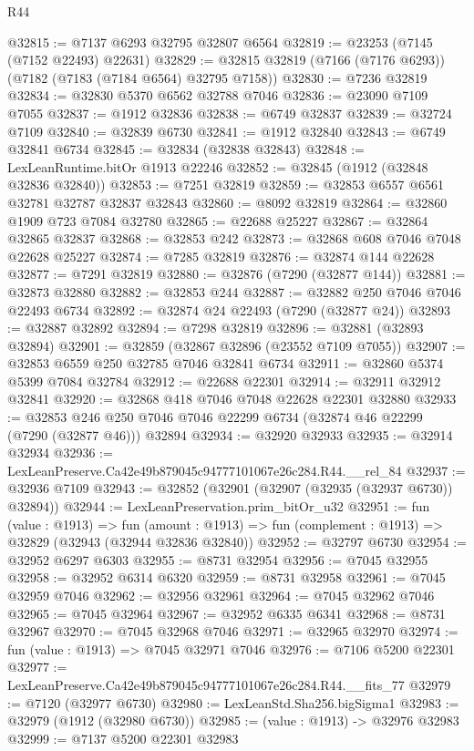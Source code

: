 \begin{lexlean}{R44}
\begin{coremodule}
{@32815 := @7137 @6293 @32795 @32807 @6564
@32819 := @23253 (@7145 (@7152 @22493) @22631)
@32829 := @32815 @32819 (@7166 (@7176 @6293)) (@7182 (@7183 (@7184 @6564) @32795 @7158))
@32830 := @7236 @32819
@32834 := @32830 @5370 @6562 @32788 @7046
@32836 := @23090 @7109 @7055
@32837 := @1912 @32836
@32838 := @6749 @32837
@32839 := @32724 @7109
@32840 := @32839 @6730
@32841 := @1912 @32840
@32843 := @6749 @32841 @6734
@32845 := @32834 (@32838 @32843)
@32848 := LexLeanRuntime.bitOr @1913 @22246
@32852 := @32845 (@1912 (@32848 @32836 @32840))
@32853 := @7251 @32819
@32859 := @32853 @6557 @6561 @32781 @32787 @32837 @32843
@32860 := @8092 @32819
@32864 := @32860 @1909 @723 @7084 @32780
@32865 := @22688 @25227
@32867 := @32864 @32865 @32837
@32868 := @32853 @242
@32873 := @32868 @608 @7046 @7048 @22628 @25227
@32874 := @7285 @32819
@32876 := @32874 @144 @22628
@32877 := @7291 @32819
@32880 := @32876 (@7290 (@32877 @144))
@32881 := @32873 @32880
@32882 := @32853 @244
@32887 := @32882 @250 @7046 @7046 @22493 @6734
@32892 := @32874 @24 @22493 (@7290 (@32877 @24))
@32893 := @32887 @32892
@32894 := @7298 @32819
@32896 := @32881 (@32893 @32894)
@32901 := @32859 (@32867 @32896 (@23552 @7109 @7055))
@32907 := @32853 @6559 @250 @32785 @7046 @32841 @6734
@32911 := @32860 @5374 @5399 @7084 @32784
@32912 := @22688 @22301
@32914 := @32911 @32912 @32841
@32920 := @32868 @418 @7046 @7048 @22628 @22301 @32880
@32933 := @32853 @246 @250 @7046 @7046 @22299 @6734 (@32874 @46 @22299 (@7290 (@32877 @46))) @32894
@32934 := @32920 @32933
@32935 := @32914 @32934
@32936 := LexLeanPreserve.Ca42e49b879045c94777101067e26c284.R44.__rel_84
@32937 := @32936 @7109
@32943 := @32852 (@32901 (@32907 (@32935 (@32937 @6730)) @32894))
@32944 := LexLeanPreservation.prim_bitOr_u32
@32951 := fun (value : @1913) =>
  fun (amount : @1913) => fun (complement : @1913) => @32829 (@32943 (@32944 @32836 @32840))
@32952 := @32797 @6730
@32954 := @32952 @6297 @6303
@32955 := @8731 @32954
@32956 := @7045 @32955
@32958 := @32952 @6314 @6320
@32959 := @8731 @32958
@32961 := @7045 @32959 @7046
@32962 := @32956 @32961
@32964 := @7045 @32962 @7046
@32965 := @7045 @32964
@32967 := @32952 @6335 @6341
@32968 := @8731 @32967
@32970 := @7045 @32968 @7046
@32971 := @32965 @32970
@32974 := fun (value : @1913) => @7045 @32971 @7046
@32976 := @7106 @5200 @22301
@32977 := LexLeanPreserve.Ca42e49b879045c94777101067e26c284.R44.__fits_77
@32979 := @7120 (@32977 @6730)
@32980 := LexLeanStd.Sha256.bigSigma1
@32983 := @32979 (@1912 (@32980 @6730))
@32985 := (value : @1913) -> @32976 @32983
@32999 := @7137
    @5200
    @22301
    @32983
}
\end{coremodule}
\end{lexlean}
